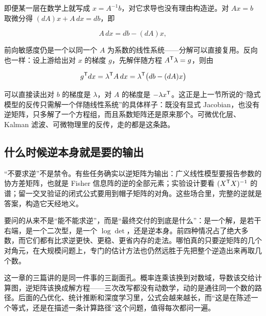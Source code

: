 即便某一层在数学上就写成 \(x=A^{-1}b\)，对它求导也没有理由构造逆。对 \(Ax=b\) 取微分得 \((dA)x+A\,dx=db\)，即

\[
A\,dx=db-(dA)x,
\]

前向敏感度仍是一个以同一个 \(A\) 为系数的线性系统——分解可以直接复用。反向也一样：设上游给出对 \(x\) 的梯度 \(g\)，先解伴随方程 \(A^{\mathsf{T}}\lambda=g\)，则由

\[
g^{\mathsf{T}}dx=\lambda^{\mathsf{T}}A\,dx=\lambda^{\mathsf{T}}\big(db-(dA)x\big)
\]

可以直接读出对 \(b\) 的梯度是 \(\lambda\)，对 \(A\) 的梯度是 \(-\lambda x^{\mathsf{T}}\)。这正是上一节所说的``隐式模型的反传只需解一个伴随线性系统''的具体样子：既没有显式 Jacobian，也没有逆矩阵，只多解了一个方程组，而且系数矩阵还是原来那个。可微优化层、Kalman 滤波、可微物理里的反传，走的都是这条路。

\subsection{什么时候逆本身就是要的输出}

``不要求逆''不是禁令。有些任务确实以逆矩阵为输出：广义线性模型要报告参数的协方差矩阵，也就是 Fisher 信息阵的逆的全部元素；实验设计要看 \((X^{\mathsf{T}}X)^{-1}\) 的谱；留一交叉验证的闭式公式要用到帽子矩阵的对角。这些场合里，完整的逆就是答案，构造它天经地义。

要问的从来不是``能不能求逆''，而是``最终交付的到底是什么''：是一个解，是若干右端，是一个二次型，是一个 \(\log\det\)，还是逆本身。前四种情况占了绝大多数，而它们都有比求逆更快、更稳、更省内存的走法。哪怕真的只要逆矩阵的几个对角元，在大规模问题上，专门的估计方法也仍然远胜于先把整个逆造出来再取几个数。

这一章的三篇讲的是同一件事的三副面孔。概率连乘该换到对数域，导数该交给计算图，逆矩阵该换成解方程——三次改写都没有动数学，动的是通往同一个数的路径。后面的凸优化、统计推断和深度学习里，公式会越来越长，而``这是在陈述一个等式，还是在描述一条计算路径''这个问题，值得每次都问一遍。
